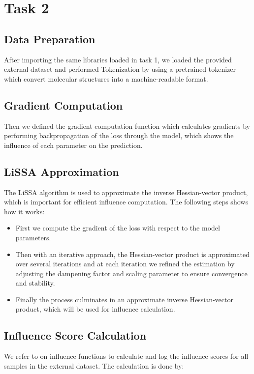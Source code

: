 \documentclass[11pt]{article}
\begin{document}
\section{Task 2}

\subsection{Data Preparation}
After importing the same libraries loaded in task 1, we loaded the provided external dataset and performed Tokenization by using a pretrained tokenizer which convert molecular structures into a machine-readable format.

\subsection{Gradient Computation}
Then we defined the gradient computation function which calculates gradients by performing backpropagation of the loss through the model, which shows the influence of each parameter on the prediction.

\subsection{LiSSA Approximation}
The LiSSA algorithm \cite{agarwal2017secondorderstochasticoptimizationmachine} is used to approximate the inverse Hessian-vector product, which is important for efficient influence computation. The following steps shows how it works:

\begin{itemize}
    \item First we compute the gradient of the loss with respect to the model parameters.
    \item Then with an iterative approach, the Hessian-vector product is approximated over several iterations and at each iteration we refined the estimation by adjusting the dampening factor and scaling parameter to ensure convergence and stability.
    \item Finally the process culminates in an approximate inverse Hessian-vector product, which will be used for influence calculation.
\end{itemize}

\subsection{Influence Score Calculation}
We refer to \cite{koh2020understandingblackboxpredictionsinfluence} on influence functions to calculate and log the influence scores for all samples in the external dataset. The calculation is done by:
\end{document}
